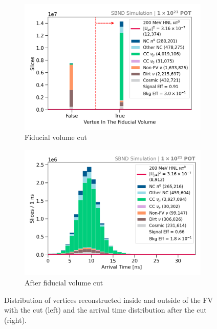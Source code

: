 \begin{figure}[htb]
        \begin{subfigure}[b]{0.495\textwidth}   
            \centering 
            \includegraphics[width=\textwidth]{fv_precut}
            \caption{Fiducial volume cut}%
            \label{fig:fv_cut}
        \end{subfigure}
        \hfill
        \begin{subfigure}[b]{0.495\textwidth}   
            \centering 
            \includegraphics[width=\textwidth]{beam_bucket_post_fv}
            \caption{After fiducial volume cut}%
            \label{fig:bb_post_fv}
        \end{subfigure}
	\caption[Fiducial Volume Cut]{
		Distribution of vertices reconstructed inside and outside of the FV with the cut (left) and the arrival time distribution after the cut (right). 
	}
        \label{fig:quality_fv_cut}
\end{figure}

